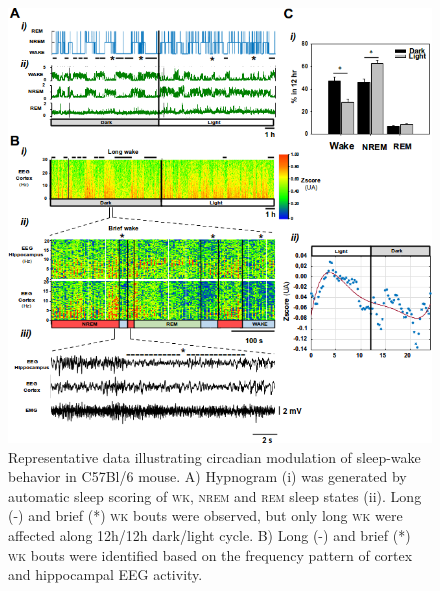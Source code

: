 \documentclass[10pt,letterpaper]{article}
\def\REM/{\textsc{rem}}
\def\NREM/{\textsc{nrem}}
\def\WK/{\textsc{wk}}
\begin{document}
\begin{figure}
	\vspace{2.5cm}
	\includegraphics[width=\textwidth]{figuras_plos1.png}
	\caption{Representative data illustrating circadian modulation of sleep-wake behavior in C57Bl/6 mouse. A) Hypnogram (i) was generated by automatic sleep scoring of \WK/, \NREM/ and \REM/ sleep states (ii). Long (-) and brief (*) \WK/ bouts were observed, but only long \WK/ were affected along 12h/12h dark/light cycle. B) Long (-) and brief (*) \WK/ bouts were identified based on the frequency pattern of cortex and hippocampal EEG activity. }
          \label{fig_raw}
\end{figure}
\end{document}
